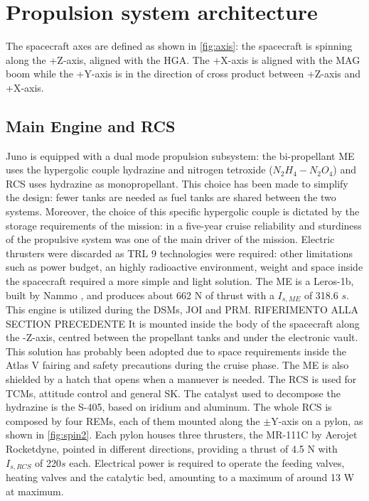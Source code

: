 \section{Propulsion system architecture}
\label{sec:prop_architecture}


The spacecraft axes are defined as shown in \autoref{fig:axis}: the spacecraft is spinning along the +Z-axis, aligned with the HGA. The +X-axis is aligned with the MAG boom while the +Y-axis is in the direction of cross product between +Z-axis and +X-axis.


\subsection{Main Engine and RCS}
\label{sec:me and rcs}
Juno is equipped with a dual mode propulsion subsystem: the bi-propellant ME uses the hypergolic couple hydrazine and nitrogen tetroxide ($N_2H_4 - N_2O_4$) and RCS uses hydrazine as monopropellant. This choice has been made to simplify the design: fewer tanks are needed as fuel tanks are shared between the two systems. Moreover, the choice of this specific hypergolic couple is dictated by the storage requirements of the mission: in a five-year cruise reliability and sturdiness of the propulsive system was one of the main driver of the mission. Electric thrusters were discarded as TRL 9 technologies were required: other limitations such as power budget, an highly radioactive environment, weight and space inside the spacecraft required a more simple and light solution.  
The ME is a Leros-1b, built by Nammo \cite{Leros}, and produces about 662 N of thrust with a $I_{s, ME}$ of 318.6 \;$s$. This engine is utilized during the DSMs, JOI and PRM. RIFERIMENTO ALLA SECTION PRECEDENTE It is mounted inside the body of the spacecraft along the -Z-axis, centred between the propellant tanks and under the electronic vault. This solution has probably been adopted due to space requirements inside the Atlas V fairing and safety precautions during the cruise phase. The ME is also shielded by a hatch that opens when a manuever is needed.
The RCS is used for TCMs, attitude control and general SK. The catalyst used to decompose the hydrazine is the S-405, based on iridium and aluminum\cite{s405}.
The whole RCS is composed by four REMs, each of them mounted along the $\pm$Y-axis on a pylon, as shown in \autoref{fig:spin2}. Each pylon houses three thrusters, the MR-111C by Aerojet Rocketdyne\cite{RCS_info}, pointed in different directions, providing a thrust of 4.5 N with $I_{s, RCS}$ of 220\;$s$ each. Electrical power is required to operate the feeding valves, heating valves and the catalytic bed, amounting to a maximum of around 13 W at maximum\cite{RCS_values}. 


